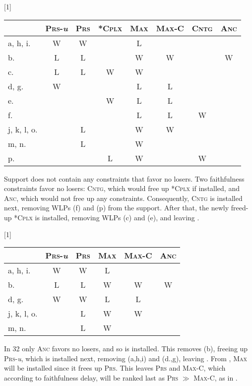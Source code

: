 \documentclass[output=paper,
modfonts
]{LSP/langsci}
\begin{document}
\ea \label{ex:round:31} 
\renewcommand*\arraystretch{1.2}
\scalebox{1}[1]{\begin{tabular}[t]{|l||c|c|c||c|c|c|c|}
\firsthline & \textsc{Prs}-\textit{u} & \textsc{Prs} & \textsc{*Cplx} & \textsc{Max} & \textsc{Max-C} &  \textsc{Cntg} &  \textsc{Anc} \\
\hline
\hline a, h, i. & W & W & & L & & & \\
\hline b. & L & L & & W & W & & W \\
\hline c. & L & L & W & W & & & \\
\hline d, g. & W & & & L & L & & \\
\hline e. & & & W & L & L & &\\
\hline f. & & & & L & L & W &\\
\hline j, k, l, o. & & L & & W & W & &\\
\hline m, n. & & L & & W & & &\\
\hline p. & & & L & W & & W & \\
\hline \end{tabular}} \renewcommand*\arraystretch{1}
\z

Support  does not contain any  constraints that favor no losers. Two faithfulness constraints favor no losers: \textsc{Cntg}, which would free up *\textsc{Cplx} if installed, and \textsc{Anc,} which would not free up any  constraints. Consequently, \textsc{Cntg} is installed next, removing WLPs (f) and (p) from the support. After that, the newly freed-up *\textsc{Cplx} is installed, removing WLPs (c) and (e), and leaving . 

\ea \label{ex:round:32} 
\renewcommand*\arraystretch{1.2}
\scalebox{1}[1]{\begin{tabular}[t]{|l||c|c||c|c|c|}
\firsthline & \textsc{Prs}-\textit{u} & \textsc{Prs} & \textsc{Max} & \textsc{Max-C} &  \textsc{Anc} \\
\hline
\hline a, h, i. & W & W & L & &  \\
\hline b. & L & L & W & W & W \\
\hline d, g. & W & W & L & L & \\
\hline j, k, l, o. & & L & W & W & \\
\hline m, n. & & L & W & & \\
\hline \end{tabular}} \renewcommand*\arraystretch{1}
\z

In 32 only \textsc{Anc} favors no losers, and so is installed. This removes (b), freeing up \textsc{Prs}-\textit{u}, which is installed next, removing (a,h,i) and (d.,g), leaving . From , \textsc{Max} will be installed since it frees up \textsc{Prs}. This leaves \textsc{Prs} and \textsc{Max-C}, which according to faithfulness delay, will be ranked last as \textsc{Prs} \textsc{${\gg}$} \textsc{Max-C,} as in . 
\end{document}
